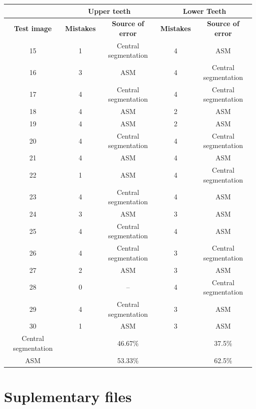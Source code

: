 \documentclass[a4paper,11pt,twoside]{article}
\begin{document}
\begin{table}[H]
\begin{center}
\begin{tabular}{|c| c c| c c |}
\cline{2-5}
 \multicolumn{1}{c}{}&  \multicolumn{2}{|c|}{Upper teeth} & \multicolumn{2}{c|}{Lower Teeth} \\ \hline
\textbf{Test image} & \textbf{Mistakes}  & \textbf{Source of error} & \textbf{Mistakes}  & \textbf{Source of error}  \\ \hline
15 &  1 & Central segmentation & 4 & ASM  \\
16 &  3 & ASM & 4 & Central segmentation \\ 
17 & 4 & Central segmentation & 4 & Central segmentation  \\ 
18 & 4  & ASM & 2 & ASM \\  
19 & 4 & ASM  & 2 & ASM \\ 
20 & 4 & Central segmentation & 4 & Central segmentation  \\ 
21 & 4 & ASM & 4 & ASM  \\ 
22 & 1 & ASM & 4 & Central segmentation  \\ 
23 & 4 & Central segmentation  & 4 & ASM \\ 
24 & 3 & ASM  & 3 & ASM \\ 
25 & 4 & Central segmentation  & 4 & ASM \\ 
26 & 4 & Central segmentation & 3 & Central segmentation  \\ 
27 & 2 & ASM  & 3 & ASM \\ 
28 & 0 & -- & 4 & Central segmentation  \\ 
29 & 4 & Central segmentation  & 3 & ASM \\ 
30 & 1 & ASM & 3 & ASM  \\ \hline 
Central segmentation &  & 46.67\% & & 37.5\% \\ \hline
ASM & & 53.33\% & & 62.5\% \\
\hline
\end{tabular}
\label{table3}
\end{center}
\end{table}

\section{Suplementary files}
\end{document}
